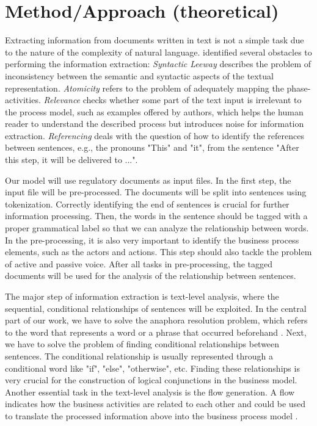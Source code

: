\chapter{Method/Approach (theoretical)}
Extracting information from documents written in text is not a simple task due to the nature of the complexity of natural language. \cite{t2m_1} identified several obstacles to performing the information extraction: \textit{Syntactic Leeway} describes the problem of inconsistency between the semantic and syntactic aspects of the textual representation. \textit{Atomicity} refers to the problem of adequately mapping the phase-activities. \textit{Relevance} checks whether some part of the text input is irrelevant to the process model, such as examples offered by authors, which helps the human reader to understand the described process but introduces noise for information extraction. \textit{Referencing} deals with the question of how to identify the references between sentences, e.g., the pronouns "This" and "it", from the sentence "After this step, it will be delivered to ...".

Our model will use regulatory documents as input files. In the first step, the input file will be pre-processed. The documents will be split into sentences using tokenization. Correctly identifying the end of sentences is crucial for further information processing. Then, the words in the sentence should be tagged with a proper grammatical label so that we can analyze the relationship between words. In the pre-processing, it is also very important to identify the business process elements, such as the actors and actions. This step should also tackle the problem of active and passive voice. After all tasks in pre-processing, the tagged documents will be used for the analysis of the relationship between sentences.

The major step of information extraction is text-level analysis, where the sequential, conditional relationships of sentences will be exploited. In the central part of our work, we have to solve the anaphora resolution problem, which refers to the word that represents a word or a phrase that occurred beforehand \cite{literature_review_4}. Next, we have to solve the problem of finding conditional relationships between sentences. The conditional relationship is usually represented through a conditional word like "if", "else", "otherwise", etc. Finding these relationships is very crucial for the construction of logical conjunctions in the business model. Another essential task in the text-level analysis is the flow generation. A flow indicates how the business activities are related to each other and could be used to translate the processed information above into the business process model \cite{t2m_1}.

